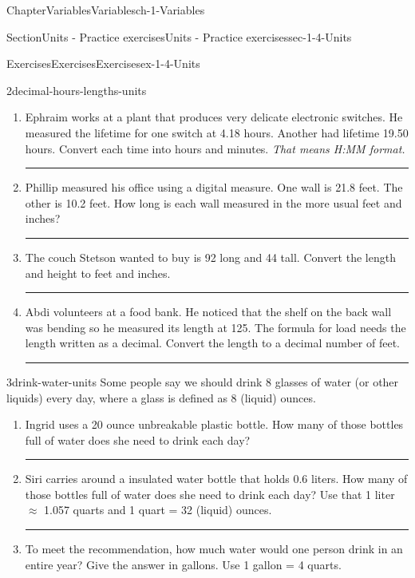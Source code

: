 \documentclass[twoside,11pt,]{book}
\newlength{\workspacestrutwidth}
\numberwithin{equation}{section}
\begin{document}
\begin{chapterptx}{Chapter}{Variables}{}{Variables}{}{}{ch-1-Variables}
\begin{sectionptx}{Section}{Units - Practice exercises}{}{Units - Practice exercises}{}{}{sec-1-4-Units}
\begin{exercises-subsection-numberless}{Exercises}{Exercises}{}{Exercises}{}{}{ex-1-4-Units}
\begin{divisionexercise}{2}{}{}{decimal-hours-lengths-units}
\begin{enumerate}[label=(\alph*),ref=\alph*]
\par\rule{\workspacestrutwidth}{1in}%
\item{}Ephraim works at a plant that produces very delicate electronic switches. He measured the lifetime for one switch at 4.18 hours. Another had lifetime 19.50 hours. Convert each time into hours and minutes. \emph{That means H:MM format.}%
\par\rule{\workspacestrutwidth}{1in}%
\item{}Phillip measured his office using a digital measure. One wall is 21.8 feet. The other is 10.2 feet. How long is each wall measured in the more usual feet and inches?%
\par\rule{\workspacestrutwidth}{1in}%
\item{}The couch Stetson wanted to buy is 92\textquotesingle\textquotesingle{} long and 44\textquotesingle\textquotesingle{} tall. Convert the length and height to feet and inches.%
\par\rule{\workspacestrutwidth}{1in}%
\item{}Abdi volunteers at a food bank. He noticed that the shelf on the back wall was bending so he measured its length at 12\textquotesingle{}5\textquotesingle\textquotesingle{}. The formula for load needs the length written as a decimal. Convert the length to a decimal number of feet.%
\par\rule{\workspacestrutwidth}{0in}%
\end{enumerate}%
\end{divisionexercise}%
\clearpage
\begin{divisionexercise}{3}{}{}{drink-water-units}%
Some people say we should drink 8 glasses of water (or other liquids) every day, where a glass is defined as 8 (liquid) ounces.%
\begin{enumerate}[label=(\alph*),ref=\alph*]%
\item{}Ingrid uses a 20 ounce unbreakable plastic bottle. How many of those bottles full of water does she need to drink each day?%
\par\rule{\workspacestrutwidth}{2in}%
\item{}Siri carries around a insulated water bottle that holds 0.6 liters. How many of those bottles full of water does she need to drink each day? Use that 1 liter \(\approx\) 1.057 quarts and 1 quart = 32 (liquid) ounces.%
\par\rule{\workspacestrutwidth}{2in}%
\item{}To meet the recommendation, how much water would one person drink in an entire year? Give the answer in gallons. Use 1 gallon = 4 quarts.%

\end{enumerate}
\end{divisionexercise}
\end{exercises-subsection-numberless}
\end{sectionptx}
\end{chapterptx}
\end{document}
